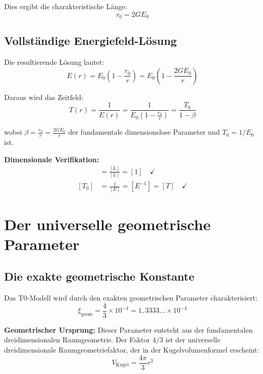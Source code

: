 \documentclass[12pt,a4paper]{report}
\newcommand{\rzero}{r_0}                  %
\newcommand{\xigeom}{\xi_{\text{geom}}}   %
\begin{document}
	Dies ergibt die charakteristische Länge:
	\begin{equation}
		\boxed{\rzero = 2GE_0}
	\end{equation}
	
	\subsection{Vollständige Energiefeld-Lösung}\label{subsec:complete_solution}
	
	Die resultierende Lösung lautet:
	\begin{equation}
		\boxed{E(r) = E_0\left(1 - \frac{\rzero}{r}\right) = E_0\left(1 - \frac{2GE_0}{r}\right)}
		\label{eq:complete_energy_solution}
	\end{equation}
	
	Daraus wird das Zeitfeld:
	\begin{equation}
		T(r) = \frac{1}{E(r)} = \frac{1}{E_0\left(1 - \frac{\rzero}{r}\right)} = \frac{T_0}{1 - \beta}
		\label{eq:time_field_solution}
	\end{equation}
	
	wobei $\beta = \frac{\rzero}{r} = \frac{2GE_0}{r}$ der fundamentale dimensionslose Parameter und $T_0 = 1/E_0$ ist.
	
	\textbf{Dimensionale Verifikation:}
	\begin{align}
		[\beta] &= \frac{[L]}{[L]} = [1] \quad \checkmark \\
		[T_0] &= \frac{1}{[E]} = [E^{-1}] = [T] \quad \checkmark
	\end{align}
	
	\section{Der universelle geometrische Parameter}\label{sec:universal_geometric_parameter}
	
	\subsection{Die exakte geometrische Konstante}\label{subsec:exact_geometric_constant}
	
	Das T0-Modell wird durch den exakten geometrischen Parameter charakterisiert:
	\begin{equation}
		\boxed{\xigeom = \frac{4}{3} \times 10^{-4} = 1,3333... \times 10^{-4}}
		\label{eq:geometric_parameter}
	\end{equation}
	
	\textbf{Geometrischer Ursprung:} Dieser Parameter entsteht aus der fundamentalen dreidimensionalen Raumgeometrie. Der Faktor $4/3$ ist der universelle dreidimensionale Raumgeometriefaktor, der in der Kugelvolumenformel erscheint:
	\begin{equation}
		V_{\text{Kugel}} = \frac{4\pi}{3}r^3
	\end{equation}
	
\end{document}

